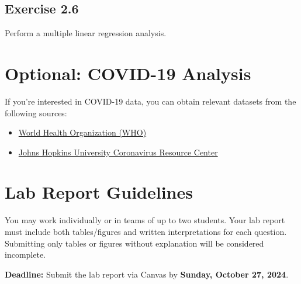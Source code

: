 \documentclass[a4paper,12pt]{article}
\begin{document}
\subsection*{Exercise 2.6}
Perform a multiple linear regression analysis.

\section*{Optional: COVID-19 Analysis}
If you're interested in COVID-19 data, you can obtain relevant datasets from the following sources:
\begin{itemize}
    \item \href{https://covid19.who.int/}{World Health Organization (WHO)}
    \item \href{https://coronavirus.jhu.edu/}{Johns Hopkins University Coronavirus Resource Center}
\end{itemize}

\section*{Lab Report Guidelines}
You may work individually or in teams of up to two students. Your lab report must include both tables/figures and written interpretations for each question. Submitting only tables or figures without explanation will be considered incomplete.

\noindent\textbf{Deadline:} Submit the lab report via Canvas by \textbf{Sunday, October 27, 2024}.
\end{document}
